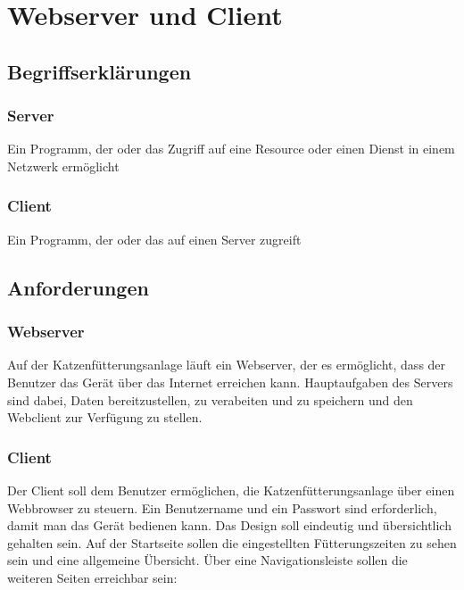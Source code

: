 \chapter{Webserver und Client}

\section{Begriffserklärungen}
\label{sec:begriffserklaerung}

\subsection{Server}
\label{sec:begrr-server}
Ein Programm, der oder das Zugriff auf eine Resource oder einen Dienst in einem Netzwerk ermöglicht

\subsection{Client}
\label{sec:begrr-client}
Ein Programm, der oder das auf einen Server zugreift

\section{Anforderungen}
\label{sec:anforderungen}

\subsection{Webserver}
\label{sec:anf-server}
Auf der Katzenfütterungsanlage läuft ein Webserver, der es ermöglicht, dass der Benutzer das Gerät über das Internet erreichen kann. Hauptaufgaben des Servers sind dabei, Daten bereitzustellen, zu verabeiten und zu speichern und den Webclient zur Verfügung zu stellen.

\subsection{Client}
\label{sec:anf-client}
Der Client soll dem Benutzer ermöglichen, die Katzenfütterungsanlage über einen Webbrowser zu steuern. Ein Benutzername und ein Passwort sind erforderlich, damit man das Gerät bedienen kann. Das Design soll eindeutig und übersichtlich gehalten sein. Auf der Startseite sollen die eingestellten Fütterungszeiten zu sehen sein und eine allgemeine Übersicht. Über eine Navigationsleiste sollen die weiteren Seiten erreichbar sein:

